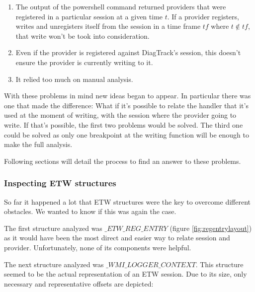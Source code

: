 \begin{enumerate}
\setlength\itemsep{0.05em}
  \item The output of the powershell command returned providers that were registered in a particular session at a given time $t$. If a provider registers, writes and unregisters itself from the session in a time frame $tf$ where $t \not\in tf$, that write won't be took into consideration.
  \item Even if the provider is registered against DiagTrack's session, this doesn't ensure the provider is currently writing to it.
  \item It relied too much on manual analysis.
\end{enumerate}

With these problems in mind new ideas began to appear. In particular there was one that made the difference: What if it's possible to relate the handler that it's used at the moment of writing, with the session where the provider going to write. If that's possible, the first two problems would be solved. The third one could be solved as only one breakpoint at the writing function will be enough to make the full analysis. 

Following sections will detail the process to find an answer to these problems.


\subsubsection{\bfseries Inspecting ETW structures}
So far it happened a lot that ETW structures were the key to overcome different obstacles. We wanted to know if this was again the case. 

The first structure analyzed was $\_ETW\_REG\_ENTRY$ (figure \ref{fig:regentrylayout}) as it would have been the most direct and easier way to relate session and provider. Unfortunately, none of its components were helpful.

The next structure analyzed was $\_WMI\_LOGGER\_CONTEXT$. This structure seemed to be the actual representation of an ETW session. Due to its size, only  necessary and representative offsets are depicted: 

